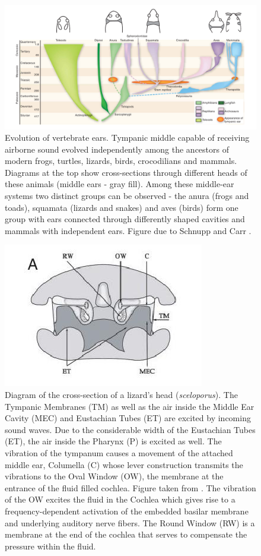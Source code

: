 \begin{figure}[ht!]
 \includegraphics[width=1.0\linewidth]{Diagrams/vertebrateearevolution.png}
 \caption[Vertebrate Ear Evolution]{Evolution of vertebrate ears. Tympanic
 middle capable of receiving airborne sound evolved independently among the ancestors of modern frogs, turtles, lizards, birds,
 crocodilians and mammals. Diagrams at the top show cross-sections through different heads of these animals (middle ears - gray fill).
 Among these middle-ear systems two distinct groups can be observed - the anura (frogs and toads), squamata (lizards and snakes)
 and aves (birds) form one group with ears connected through differently shaped cavities and mammals with independent ears. Figure due to Schnupp and Carr \cite{schnuppcarr}.}
 \label{vertebrateearevolution}
\end{figure}

\begin{figure}[ht!]
 \centering
 \includegraphics[width=0.45\linewidth]{Diagrams/lizardheadcrosssection.jpeg}
 \caption[Cross Section of a Lizards Head]{Diagram of the cross-section of a lizard’s head (\emph{sceloporus}). The Tympanic Membranes (TM) as well as
 the air inside the Middle Ear Cavity (MEC) and Eustachian Tubes (ET) are excited by incoming sound waves. Due to the considerable width of the Eustachian Tubes (ET), the air inside the Pharynx (P) is excited as well.
 The vibration of the tympanum causes a movement of the attached middle ear, Columella (C) whose lever construction transmits the vibrations to the Oval Window (OW), the membrane at the entrance of the fluid filled cochlea.
 Figure taken from \cite{dalsgaardmanley1}. The vibration of the OW excites the fluid in the Cochlea which gives rise to a frequency-dependent activation of the embedded basilar membrane and underlying
 auditory nerve fibers. The Round Window (RW) is a membrane at the end of the cochlea that serves to compensate the pressure within the fluid.}
 \label{lizardheadcrosssection}
\end{figure}

